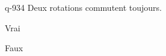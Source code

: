 \begin{truefalse}{q-934}
Deux rotations commutent toujours.
\item Vrai
\item* Faux
\end{truefalse}

